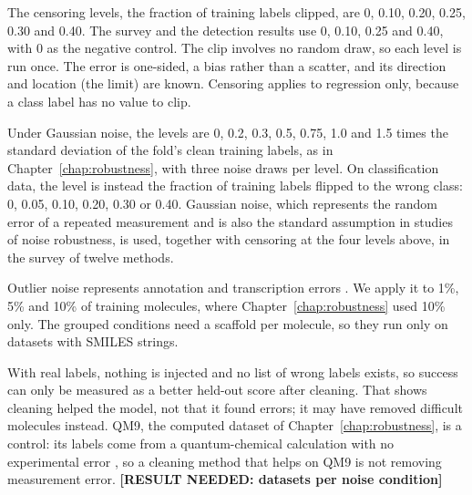 The censoring levels, the fraction of training labels clipped, are 0, 0.10, 0.20, 0.25, 0.30 and 0.40. The survey and the detection results use 0, 0.10, 0.25 and 0.40, with 0 as the negative control. The clip involves no random draw, so each level is run once. The error is one-sided, a bias rather than a scatter, and its direction and location (the limit) are known. Censoring applies to regression only, because a class label has no value to clip.

Under Gaussian noise, the levels are 0, 0.2, 0.3, 0.5, 0.75, 1.0 and 1.5 times the standard deviation of the fold's clean training labels, as in Chapter~\ref{chap:robustness}, with three noise draws per level. On classification data, the level is instead the fraction of training labels flipped to the wrong class: 0, 0.05, 0.10, 0.20, 0.30 or 0.40. Gaussian noise, which represents the random error of a repeated measurement and is also the standard assumption in studies of noise robustness, is used, together with censoring at the four levels above, in the survey of twelve methods.

Outlier noise represents annotation and transcription errors \citep{Kalliokoski2013, Hampel2001}. We apply it to 1\%, 5\% and 10\% of training molecules, where Chapter~\ref{chap:robustness} used 10\% only. The grouped conditions need a scaffold per molecule, so they run only on datasets with SMILES strings.

With real labels, nothing is injected and no list of wrong labels exists, so success can only be measured as a better held-out score after cleaning. That shows cleaning helped the model, not that it found errors; it may have removed difficult molecules instead. QM9, the computed dataset of Chapter~\ref{chap:robustness}, is a control: its labels come from a quantum-chemical calculation with no experimental error \citep{Ramakrishnan2014}, so a cleaning method that helps on QM9 is not removing measurement error. \textbf{[RESULT NEEDED: datasets per noise condition]}



